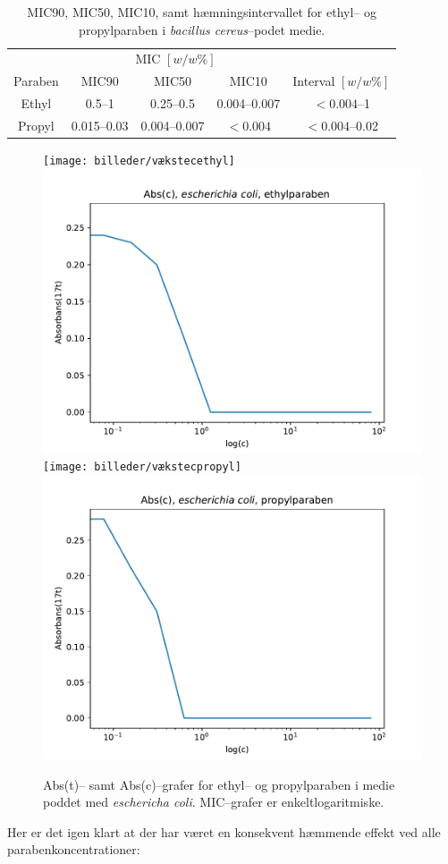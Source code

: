     \begin{table}[H]\centering
        \caption{MIC90, MIC50, MIC10, samt hæmningsintervallet for ethyl-- og propylparaben i \textit{bacillus cereus}--podet medie.}
        \begin{tabular}{ccccc}
            \toprule
            & \multicolumn{3}{c}{MIC $\left[\si{w\per w \%}\right]$} & \\
            \cmidrule(r){2-4}
            Paraben & MIC90 & MIC50 & MIC10 & Interval $\left[\si{w\per w \%}\right]$ \\
            \midrule
            Ethyl & 0.5--1 & 0.25--0.5 & 0.004--0.007 & $<0.004$--1 \\
            Propyl & 0.015--0.03 & 0.004--0.007 & $<0.004$ & $<0.004$--0.02 \\
            \bottomrule
        \end{tabular}
    \end{table}
    \begin{figure}[H]\centering
        \texttt{[image: billeder/vækstecethyl]}
        \includegraphics[width=.48\linewidth]{billeder/micecethyl}
        \texttt{[image: billeder/vækstecpropyl]}
        \includegraphics[width=.48\linewidth]{billeder/micecpropyl}
        \caption{Abs(t)-- samt Abs(c)--grafer for ethyl-- og propylparaben i medie poddet med \textit{eschericha coli}. MIC--grafer er enkeltlogaritmiske.}
    \end{figure}
    Her er det igen klart at der har været en konsekvent hæmmende effekt ved alle parabenkoncentrationer:
